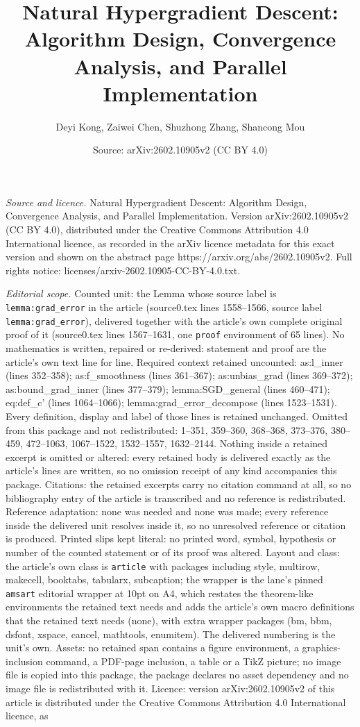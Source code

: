 \documentclass[10pt,a4paper]{amsart}
\title[Natural Hypergradient Descent: Algorithm Design, Convergence]{Natural Hypergradient Descent: Algorithm Design, Convergence Analysis, and Parallel Implementation}
\author{Deyi Kong, Zaiwei Chen, Shuzhong Zhang, Shancong Mou}
\date{Source: arXiv:2602.10905v2 (CC BY 4.0)}
\begin{document}
\maketitle

\noindent\emph{Source and licence.} Natural Hypergradient Descent: Algorithm Design, Convergence Analysis, and Parallel Implementation. Version arXiv:2602.10905v2 (CC BY 4.0), distributed under the Creative Commons Attribution 4.0 International licence, as recorded in the arXiv licence metadata for this exact version and shown on the abstract page https://arxiv.org/abs/2602.10905v2. Full rights notice: licenses/arxiv-2602.10905-CC-BY-4.0.txt.\par\smallskip

\noindent\textit{Editorial scope.} Counted unit: the Lemma whose source label is \texttt{lemma:grad\_error} in the article (source0.tex lines 1558--1566, source label \texttt{lemma:grad\_error}), delivered together with the article's own complete original proof of it (source0.tex lines 1567--1631, one \texttt{proof} environment of 65 lines). No mathematics is written, repaired or re-derived: statement and proof are the article's own text line for line. Required context retained uncounted: as:l\_inner (lines 352--358); as:f\_smoothness (lines 361--367); as:unbias\_grad (lines 369--372); as:bound\_grad\_inner (lines 377--379); lemma:SGD\_general (lines 460--471); eq:def\_c' (lines 1064--1066); lemma:grad\_error\_decompose (lines 1523--1531). Every definition, display and label of those lines is retained unchanged. Omitted from this package and not redistributed: 1--351, 359--360, 368--368, 373--376, 380--459, 472--1063, 1067--1522, 1532--1557, 1632--2144. Nothing inside a retained excerpt is omitted or altered: every retained body is delivered exactly as the article's lines are written, so no omission receipt of any kind accompanies this package. Citations: the retained excerpts carry no citation command at all, so no bibliography entry of the article is transcribed and no reference is redistributed. Reference adaptation: none was needed and none was made; every reference inside the delivered unit resolves inside it, so no unresolved reference or citation is produced. Printed slips kept literal: no printed word, symbol, hypothesis or number of the counted statement or of its proof was altered. Layout and class: the article's own class is \texttt{article} with packages including style, multirow, makecell, booktabs, tabularx, subcaption; the wrapper is the lane's pinned \texttt{amsart} editorial wrapper at 10pt on A4, which restates the theorem-like environments the retained text needs and adds the article's own macro definitions that the retained text needs (none), with extra wrapper packages (bm, bbm, dsfont, xspace, cancel, mathtools, enumitem). The delivered numbering is the unit's own. Assets: no retained span contains a figure environment, a graphics-inclusion command, a PDF-page inclusion, a table or a TikZ picture; no image file is copied into this package, the package declares no asset dependency and no image file is redistributed with it. Licence: version arXiv:2602.10905v2 of this article is distributed under the Creative Commons Attribution 4.0 International licence, as 
\end{document}
